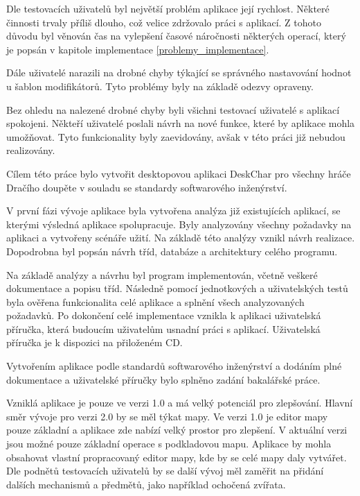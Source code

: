 \documentclass[thesis=B,czech]{resources/FITthesis}[2012/06/26]
\begin{document}
Dle testovacích uživatelů byl největší problém aplikace její rychlost. Některé činnosti trvaly příliš dlouho, což velice zdržovalo práci s aplikací. Z tohoto důvodu byl věnován čas na vylepšení časové náročnosti některých operací, který je popsán v kapitole implementace \ref{problemy_implementace}. \par

Dále uživatelé narazili na drobné chyby týkající se správného nastavování hodnot u šablon modifikátorů. Tyto problémy byly na základě odezvy opraveny. \par

Bez ohledu na nalezené drobné chyby byli všichni testovací uživatelé s aplikací spokojeni. Někteří uživatelé poslali návrh na nové funkce, které by aplikace mohla umožňovat. Tyto funkcionality byly zaevidovány, avšak v této práci již nebudou realizovány. 

\begin{conclusion}
Cílem této práce bylo vytvořit desktopovou aplikaci DeskChar pro všechny hráče Dračího doupěte v souladu se standardy softwarového inženýrství. \par

V první fázi vývoje aplikace byla vytvořena analýza již existujících aplikací, se kterými výsledná aplikace spolupracuje. Byly analyzovány všechny požadavky na aplikaci a vytvořeny scénáře užití. Na základě této analýzy vznikl návrh realizace. Dopodrobna byl popsán návrh tříd, databáze a architektury celého programu. \par

Na základě analýzy a návrhu byl program implementován, včetně veškeré dokumentace a popisu tříd. Následně pomocí jednotkových a uživatelských testů byla ověřena funkcionalita celé aplikace a splnění všech analyzovaných požadavků. Po dokončení celé implementace vznikla k aplikaci uživatelská příručka, která budoucím uživatelům usnadní práci s aplikací. Uživatelská příručka je k dispozici na přiloženém CD. \par

Vytvořením aplikace podle standardů softwarového inženýrství a dodáním plné dokumentace a uživatelské příručky bylo splněno zadání bakalářské práce. \par

Vzniklá aplikace je pouze ve verzi 1.0 a má velký potenciál pro zlepšování. Hlavní směr vývoje pro verzi 2.0 by se měl týkat mapy. Ve verzi 1.0 je editor mapy pouze základní a aplikace zde nabízí velký prostor pro zlepšení. V aktuální verzi jsou možné pouze základní operace s podkladovou mapu. Aplikace by mohla obsahovat vlastní propracovaný editor mapy, kde by se celé mapy daly vytvářet. Dle podnětů testovacích uživatelů by se další vývoj měl zaměřit na přidání dalších mechanismů a předmětů, jako například ochočená zvířata.

\end{conclusion}
\end{document}

